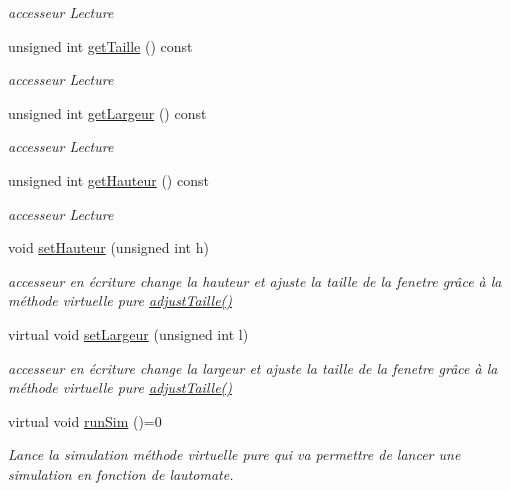 \begin{DoxyCompactItemize}
\begin{DoxyCompactList}\small\item\em accesseur Lecture \end{DoxyCompactList}\item 
unsigned int \hyperlink{class_autocell_af4649cfcee8d1eb6250de48110d2dda0}{get\+Taille} () const 
\begin{DoxyCompactList}\small\item\em accesseur Lecture \end{DoxyCompactList}\item 
unsigned int \hyperlink{class_autocell_af95bce9bd555eee6e38752a639265799}{get\+Largeur} () const 
\begin{DoxyCompactList}\small\item\em accesseur Lecture \end{DoxyCompactList}\item 
unsigned int \hyperlink{class_autocell_a6211b452c915737d2165dc7aeb7c31ba}{get\+Hauteur} () const 
\begin{DoxyCompactList}\small\item\em accesseur Lecture \end{DoxyCompactList}\item 
void \hyperlink{class_autocell_a8644ce5042e0849ebe0b0f045eed18a0}{set\+Hauteur} (unsigned int h)
\begin{DoxyCompactList}\small\item\em accesseur en écriture change la hauteur et ajuste la taille de la fenetre grâce à la méthode virtuelle pure \hyperlink{class_autocell_a060d956fa55ae3871081b3ecb949689f}{adjust\+Taille()} \end{DoxyCompactList}\item 
virtual void \hyperlink{class_autocell_a73af052faee8acf25c6f91aba3493004}{set\+Largeur} (unsigned int l)
\begin{DoxyCompactList}\small\item\em accesseur en écriture change la largeur et ajuste la taille de la fenetre grâce à la méthode virtuelle pure \hyperlink{class_autocell_a060d956fa55ae3871081b3ecb949689f}{adjust\+Taille()} \end{DoxyCompactList}\item 
virtual void \hyperlink{class_autocell_a83fb2030039bcddc40ee72f44ac38e63}{run\+Sim} ()=0
\begin{DoxyCompactList}\small\item\em Lance la simulation méthode virtuelle pure qui va permettre de lancer une simulation en fonction de l\textquotesingle{}automate. \end{DoxyCompactList}\item 

\end{DoxyCompactItemize}
